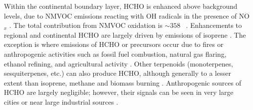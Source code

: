     Within the continental boundary layer, HCHO is enhanced above background levels, due to NMVOC emissions reacting with OH radicals in the presence of NO$_x$ \parencite{Wagner2002, Millet2006, Kefauver2014}.
    The total contribution from NMVOC oxidation is $\sim 358$\tgpyr 
    ~\parencite{FortemsCheiney2012}.
    Enhancements to regional and continental HCHO are largely driven by emissions of isoprene \parencite{Guenther1995, Palmer2003, Shim2005, Kefauver2014}.
    The exception is where emissions of HCHO or precursors occur due to fires or anthropogenic activities such as fossil fuel combustion, natural gas flaring, ethanol refining, and agricultural activity \parencite{Guenther1995, Kefauver2014, Wolfe2016}.
    Other terpenoids (monoterpenes, sesquiterpenes, etc.) can also produce HCHO, although generally to a lesser extent than isoprene, methane and biomass burning \parencite{Guenther2012}.
    Anthropogenic sources of HCHO are largely negligible; however, their signals can be seen in very large cities or near large industrial sources \parencite{Millet2008,Zhu2014}.
    
